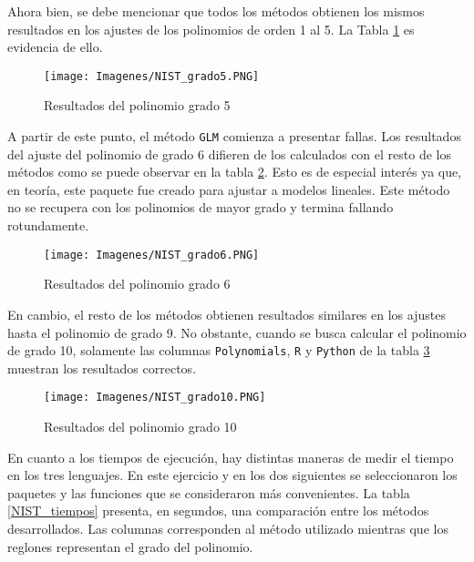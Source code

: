 Ahora bien, se debe mencionar que todos los métodos obtienen los mismos resultados en los ajustes de los polinomios de orden 1 al 5. La Tabla \ref{NIST_res_gr5} es evidencia de ello. 

\begin{figure}[h]
	\begin{center}
		\texttt{[image: Imagenes/NIST\_grado5.PNG]}
		\caption{Resultados del polinomio grado 5}
		\label{NIST_res_gr5}
	\end{center}
\end{figure}

A partir de este punto, el método \texttt{GLM} comienza a presentar fallas. Los resultados del ajuste del polinomio de grado 6 difieren de los calculados con el resto de los métodos como se puede observar en la tabla \ref{NIST_res_gr6}. Esto es de especial interés ya que, en teoría, este paquete fue creado para ajustar a modelos lineales. Este método no se recupera con los polinomios de mayor grado y termina fallando rotundamente.


\begin{figure}[h]
\begin{center}
\texttt{[image: Imagenes/NIST\_grado6.PNG]}
\caption{Resultados del polinomio grado 6}
\label{NIST_res_gr6}
\end{center}
\end{figure}

En cambio, el resto de los métodos obtienen resultados similares en los ajustes hasta el polinomio de grado 9. No obstante, cuando se busca calcular el polinomio de grado 10, solamente las columnas \texttt{Polynomials}, \texttt{R} y \texttt{Python} de la tabla \ref{NIST_res_gr10} muestran los resultados correctos. 

\begin{figure}[h]
\begin{center}
\texttt{[image: Imagenes/NIST\_grado10.PNG]}
\caption{Resultados del polinomio grado 10}
\label{NIST_res_gr10}
\end{center}
\end{figure}

En cuanto a los tiempos de ejecución, hay distintas maneras de medir el tiempo en los tres lenguajes. En este ejercicio y en los dos siguientes se seleccionaron los paquetes y las funciones que se consideraron más convenientes. La tabla \ref{NIST_tiempos} presenta, en segundos, una comparación entre los métodos desarrollados. Las columnas corresponden al método utilizado mientras que los reglones representan el grado del polinomio. 


